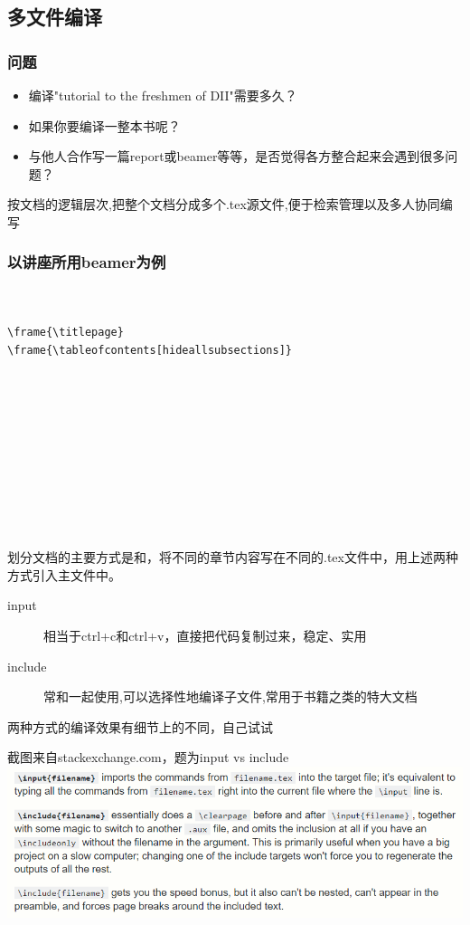 \subsection{多文件编译}
	\begin{frame}
	    \frametitle{问题}
		\begin{itemize}
			\item 编译"tutorial to the freshmen of DII"需要多久？\pause
			\item 如果你要编译一整本书呢？\pause
			\item 与他人合作写一篇report或beamer等等，是否觉得各方整合起来会遇到很多问题？
		\end{itemize}\pause
	按文档的逻辑层次,把整个文档分成多个.tex源文件,便于检索管理以及多人协同编写
	\end{frame}
	
	\begin{frame}[fragile]
	    \frametitle{以讲座所用beamer为例}
	    \vspace{-3ex}
\begin{lstlisting}


\frame{\titlepage}
\frame{\tableofcontents[hideallsubsections]}











\end{lstlisting}
	\end{frame}

	\begin{frame}[fragile]
		\indent 划分文档的主要方式是\verb||和\verb||，将不同的章节内容写在不同的.tex文件中，用上述两种方式引入主文件中。\\
		\begin{description}
			\item[input] 相当于ctrl+c和ctrl+v，直接把代码复制过来，稳定、实用
			\item[include] 常和\verb||一起使用,可以选择性地编译子文件,常用于书籍之类的特大文档
		\end{description}
		\indent 两种方式的编译效果有细节上的不同，自己试试
	\end{frame}

	\begin{frame}
	截图来自stackexchange.com，题为input vs include
	\includegraphics[width=\textwidth]{img//vs.png}	
	\end{frame}

